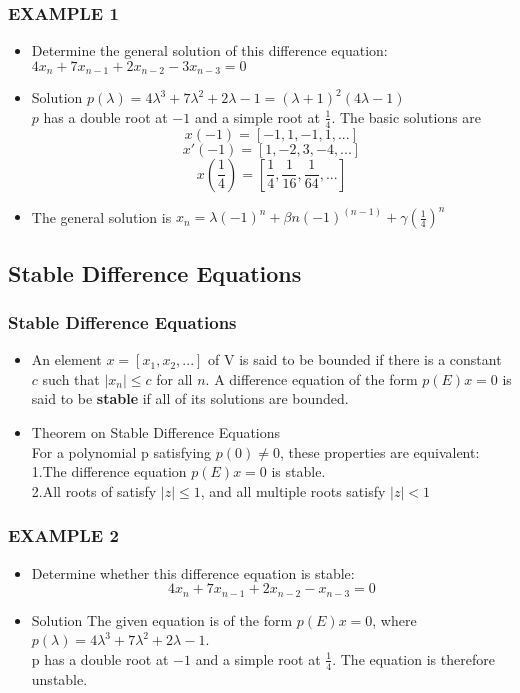 \documentclass[notheorems,mathserif,table,compress]{beamer}  %
\begin{document}
\begin{frame}
\frametitle{EXAMPLE 1}
\begin{itemize}
\item Determine the general solution of this difference equation: $4x_{n}+7x_{n-1}+2x_{n-2}-3x_{n-3}=0$
\item Solution $p(\lambda)=4\lambda^{3}+7\lambda^{2}+2\lambda-1=(\lambda+1)^{2}(4\lambda-1)$ \\
$p$ has a double root at $-1$ and a simple root at $\frac{1}{4}$. The basic solutions are
\begin{displaymath}
x(-1)=[-1, 1, -1, 1,...]
\end{displaymath}
\begin{displaymath}
x'(-1)=[1, -2, 3, -4,...]
\end{displaymath}
\begin{displaymath}
x(\frac{1}{4})=[\frac{1}{4}, \frac{1}{16}, \frac{1}{64}, ...]
\end{displaymath}
\item The general solution is $x_{n}=\lambda(-1)^n+\beta n(-1)^{(n-1)}+\gamma (\frac{1}{4})^n$
\end{itemize}
\end{frame}

\subsection{Stable Difference Equations}
\begin{frame}
\frametitle{Stable Difference Equations}
\begin{itemize}
\item An element $x=[x_{1}, x_{2},...]$ of V is said to be bounded if there is a constant $c$ such that $|x_{n}|\leq c$ for all $n$. A difference equation of the form $p(E)x=0$ is said to be \textbf{stable} if all of its solutions are bounded.
\newline
\item Theorem on Stable Difference Equations \\
For a polynomial p satisfying $p(0)\neq0$, these properties are equivalent:\\
1.The difference equation $p(E)x=0$ is stable.\\
2.All roots of satisfy $|z|\leq1$, and all multiple roots satisfy $|z|<1$
\end{itemize}
\end{frame}

\begin{frame}
\frametitle{EXAMPLE 2}
\begin{itemize}
\item Determine whether this difference equation is stable:
\begin{displaymath}
4x_{n}+7x_{n-1}+2x_{n-2}-x_{n-3}=0
\end{displaymath}
\item Solution The given equation is of the form $p(E)x=0$, where $p(\lambda)=4\lambda^{3}+7\lambda^{2}+2\lambda-1$.\\
p has a double root at $-1$ and a simple root at $\frac{1}{4}$. The equation is therefore unstable.
\end{itemize}
\end{frame}
  
\end{document}
